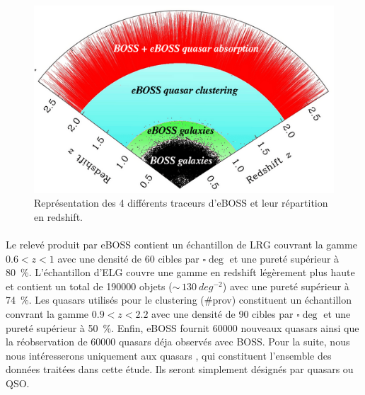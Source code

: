\begin{figure}
  \centering
  \includegraphics[scale=0.5]{eBOSStracers}
  \caption{Représentation des 4 différents traceurs d'eBOSS et leur r\'epartition en redshift.}
  \label{fig:eBOSStracers}
\end{figure}
\paragraph{}
Le relevé produit par eBOSS contient un échantillon de LRG couvrant la gamme $\num{0,6} < z < \num{1}$ avec une densité de 60 cibles par $\si{\square\deg}$ et une pureté supérieur à \SI{80}{\percent}. L'échantillon d'ELG couvre une gamme en redshift légèrement plus haute et contient un total de \num{190000} objets ($\sim\,\SI{130}{deg^{-2}}$) avec une pureté supérieur à \SI{74}{\percent}. Les quasars utilisés pour le clustering (\#prov) constituent un échantillon convrant la gamme $\num{0,9} < z < \num{2,2}$ avec une densité de 90 cibles par $\si{\square\deg}$ et une pureté supérieur à \SI{50}{\percent}. Enfin, eBOSS fournit \num{60000} nouveaux quasars \lya{} ainsi que la réobservation de \num{60000} quasars \lya{} déja observés avec BOSS. Pour la suite, nous nous intéresserons uniquement aux quasars \lya{}, qui constituent l'ensemble des données traitées dans cette étude. Ils seront simplement désignés par quasars ou QSO.




